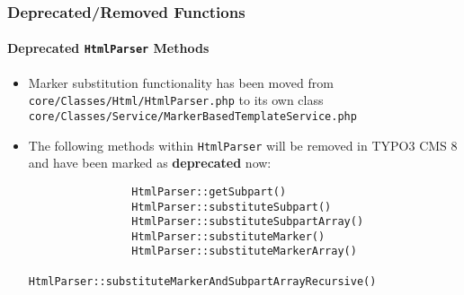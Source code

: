 
\begin{frame}[fragile]
	\frametitle{Deprecated/Removed Functions}
	\framesubtitle{Deprecated \texttt{HtmlParser} Methods}


	\begin{itemize}

		\item Marker substitution functionality has been moved from\newline
			\texttt{core/Classes/Html/HtmlParser.php}\newline
			to its own class\newline
			\texttt{core/Classes/Service/MarkerBasedTemplateService.php}

		\item The following methods within \texttt{HtmlParser} will be removed
			in TYPO3 CMS 8 and have been marked as \textbf{deprecated} now:

			\begin{lstlisting}
				HtmlParser::getSubpart()
				HtmlParser::substituteSubpart()
				HtmlParser::substituteSubpartArray()
				HtmlParser::substituteMarker()
				HtmlParser::substituteMarkerArray()
				HtmlParser::substituteMarkerAndSubpartArrayRecursive()
			\end{lstlisting}

	\end{itemize}

\end{frame}


